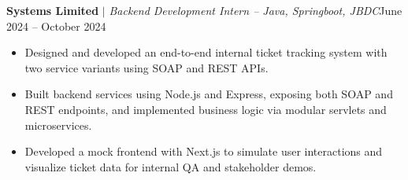               \resumeProjectHeading
              {\textbf{Systems Limited}\vspace{8pt} $|$ \footnotesize\emph{Backend Development Intern – Java, Springboot, JBDC}}{June 2024 -- October 2024}
              \begin{itemize}
                \item Designed and developed an end-to-end internal ticket tracking system with two service variants using SOAP and REST APIs.
                \item Built backend services using Node.js and Express, exposing both SOAP and REST endpoints, and implemented business logic via modular servlets and microservices.
                \item Developed a mock frontend with Next.js to simulate user interactions and visualize ticket data for internal QA and stakeholder demos.
              \end{itemize}



    \resumeSubHeadingListEnd